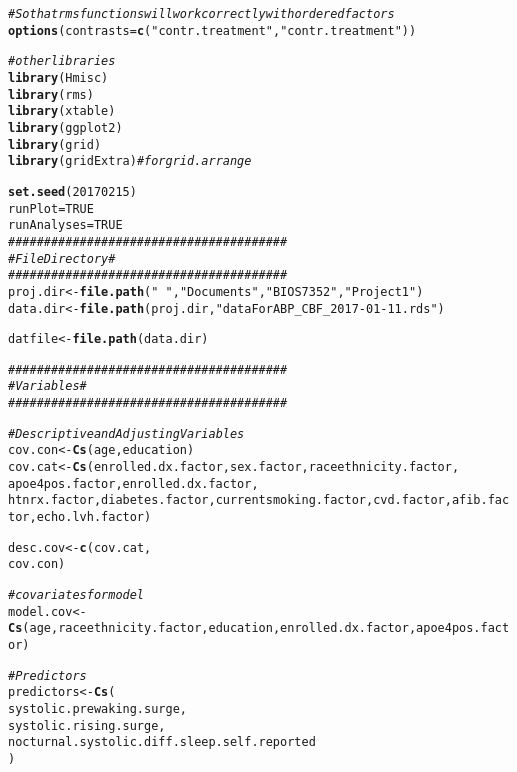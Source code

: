 \documentclass[10pt]{article}\usepackage[]{graphicx}\usepackage[]{color}
\makeatletter
\newcommand{\hlnum}[1]{\textcolor[rgb]{0.686,0.059,0.569}{#1}}%
\newcommand{\hlstr}[1]{\textcolor[rgb]{0.192,0.494,0.8}{#1}}%
\newcommand{\hlcom}[1]{\textcolor[rgb]{0.678,0.584,0.686}{\textit{#1}}}%
\newcommand{\hlstd}[1]{\textcolor[rgb]{0.345,0.345,0.345}{#1}}%
\newcommand{\hlkwb}[1]{\textcolor[rgb]{0.69,0.353,0.396}{#1}}%
\newcommand{\hlkwc}[1]{\textcolor[rgb]{0.333,0.667,0.333}{#1}}%
\newcommand{\hlkwd}[1]{\textcolor[rgb]{0.737,0.353,0.396}{\textbf{#1}}}%
\newenvironment{kframe}{%
 \def\at@end@of@kframe{}%
 \ifinner\ifhmode%
  \def\at@end@of@kframe{\end{minipage}}%
  \begin{minipage}{\columnwidth}%
 \fi\fi%
 \def\FrameCommand##1{\hskip\@totalleftmargin \hskip-\fboxsep
 \colorbox{shadecolor}{##1}\hskip-\fboxsep
     \hskip-\linewidth \hskip-\@totalleftmargin \hskip\columnwidth}%
 \MakeFramed {\advance\hsize-\width
   \@totalleftmargin\z@ \linewidth\hsize
   \@setminipage}}%
 {\par\unskip\endMakeFramed%
 \at@end@of@kframe}
\newenvironment{knitrout}{}{} %
\makeatother
\begin{document}
\begin{knitrout}
\begin{kframe}
\begin{alltt}
\hlcom{# So that rms functions will work correctly with ordered factors}
\hlkwd{options}\hlstd{(}\hlkwc{contrasts}\hlstd{=}\hlkwd{c}\hlstd{(}\hlstr{"contr.treatment"}\hlstd{,}\hlstr{"contr.treatment"}\hlstd{))}


\hlcom{# other libraries}
\hlkwd{library}\hlstd{(Hmisc)}
\hlkwd{library}\hlstd{(rms)}
\hlkwd{library}\hlstd{(xtable)}
\hlkwd{library}\hlstd{(ggplot2)}
\hlkwd{library}\hlstd{(grid)}
\hlkwd{library}\hlstd{(gridExtra)} \hlcom{# for grid.arrange}

\hlkwd{set.seed}\hlstd{(}\hlnum{20170215}\hlstd{)}
\hlstd{runPlot}\hlkwb{=}\hlnum{TRUE}
\hlstd{runAnalyses}\hlkwb{=}\hlnum{TRUE}
\hlcom{#######################################}
\hlcom{#  File Directory                     #}
\hlcom{#######################################}
\hlstd{proj.dir} \hlkwb{<-} \hlkwd{file.path}\hlstd{(}\hlstr{"~"}\hlstd{,} \hlstr{"Documents"}\hlstd{,} \hlstr{"BIOS7352"}\hlstd{,} \hlstr{"Project1"}\hlstd{)}
\hlstd{data.dir} \hlkwb{<-} \hlkwd{file.path}\hlstd{(proj.dir,} \hlstr{"dataForABP_CBF_2017-01-11.rds"}\hlstd{)}

\hlstd{datfile}  \hlkwb{<-} \hlkwd{file.path}\hlstd{(data.dir)}

\hlcom{#######################################}
\hlcom{#  Variables                          #}
\hlcom{#######################################}

\hlcom{# Descriptive and Adjusting Variables}
\hlstd{cov.con} \hlkwb{<-} \hlkwd{Cs}\hlstd{(age, education)}
\hlstd{cov.cat} \hlkwb{<-} \hlkwd{Cs}\hlstd{(enrolled.dx.factor, sex.factor, raceethnicity.factor,}
              \hlstd{apoe4pos.factor, enrolled.dx.factor,}
              \hlstd{htnrx.factor, diabetes.factor, currentsmoking.factor, cvd.factor, afib.factor,  echo.lvh.factor)}

\hlstd{desc.cov} \hlkwb{<-} \hlkwd{c}\hlstd{(cov.cat,}
              \hlstd{cov.con)}

\hlcom{#covariates for model}
\hlstd{model.cov} \hlkwb{<-} \hlkwd{Cs}\hlstd{(age, raceethnicity.factor, education, enrolled.dx.factor, apoe4pos.factor)}

\hlcom{#Predictors}
\hlstd{predictors} \hlkwb{<-} \hlkwd{Cs}\hlstd{(}
    \hlstd{systolic.prewaking.surge,}
    \hlstd{systolic.rising.surge,}
    \hlstd{nocturnal.systolic.diff.sleep.self.reported}
\hlstd{)}


\end{alltt}
\end{kframe}
\end{knitrout}
\end{document}
